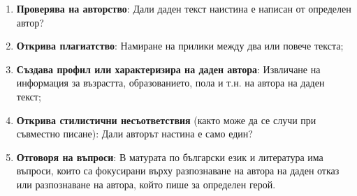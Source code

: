 \documentclass[12pt]{article}
\begin{document}
\begin{enumerate}
    \item \textbf{Проверява на авторство}: Дали даден текст наистина е написан от определен автор?
    \item \textbf{Открива плагиатство}: Намиране на прилики между два или повече текста;
    \item \textbf{Създава профил или характеризира на даден автора}: Извличане на информация за възрастта, образованието, пола и т.н. на автора на даден текст;
    \item \textbf{Открива стилистични несъответствия} (както може да се случи при съвместно писане): Дали авторът настина е само един?
    \item \textbf{Отговоря на въпроси}: В матурата по български език и литература има въпроси, които са фокусирани върху разпознаване на автора на даден отказ или разпознаване на автора, който пише за определен герой.
\end{enumerate}

\end{document}
